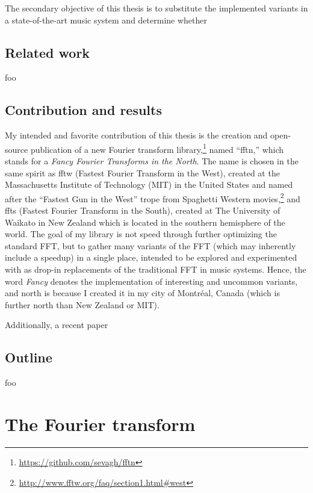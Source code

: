 \documentclass[letter,12pt]{article}
\begin{document}
The secondary objective of this thesis is to substitute the implemented variants in a state-of-the-art music system and determine whether 

\subsection{Related work}

foo

\subsection{Contribution and results}

My intended and favorite contribution of this thesis is the creation and open-source publication of a new Fourier transform library,\footnote{\href{https://github.com/sevagh/fftn}{https://github.com/sevagh/fftn}} named ``fftn,'' which stands for a \textit{Fancy Fourier Transforms in the North}. The name is chosen in the same spirit as fftw\cite{fftw} (Fastest Fourier Transform in the West), created at the Massachusetts Institute of Technology (MIT) in the United States and named after the ``Fastest Gun in the West'' trope from Spaghetti Western movies,\footnote{\href{http://www.fftw.org/faq/section1.html\#west}{http://www.fftw.org/faq/section1.html\#west}} and ffts\cite{ffts} (Fastest Fourier Transform in the South), created at The University of Waikato in New Zealand which is located in the southern hemisphere of the world. The goal of my library is not speed through further optimizing the standard FFT, but to gather many variants of the FFT (which may inherently include a speedup) in a single place, intended to be explored and experimented with as drop-in replacements of the traditional FFT in music systems. Hence, the word \textit{Fancy} denotes the implementation of interesting and uncommon variants, and north is because I created it in my city of Montr{\'e}al, Canada (which is further north than New Zealand or MIT).

Additionally, a recent paper 

\subsection{Outline}

foo

\section{The Fourier transform}
\end{document}
